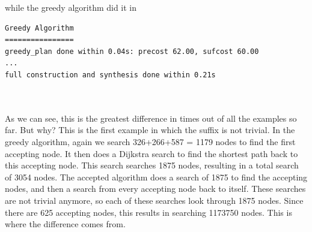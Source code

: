 while the greedy algorithm did it in \\


\begin{minipage}{\textwidth}
\begingroup
\fontsize{9pt}{12pt}\selectfont
\begin{lstlisting}
Greedy Algorithm
================
greedy_plan done within 0.04s: precost 62.00, sufcost 60.00
...
full construction and synthesis done within 0.21s 
\end{lstlisting}
\endgroup
\end{minipage} \\ \\


As we can see, this is the greatest difference in times out of all the examples so far. But why? This is the first example in which the suffix is not trivial. In the greedy algorithm, again we search 326+266+587 = 1179 nodes to find the first accepting node. It then does a Dijkstra search to find the shortest path back to this accepting node. This search searches 1875 nodes, resulting in a total search of 3054 nodes. The accepted algorithm does a search of 1875 to find the accepting nodes, and then a search from every accepting node back to itself. These searches are not trivial anymore, so each of these searches look through 1875 nodes. Since there are 625 accepting nodes, this results in searching 1173750 nodes. This is where the difference comes from. 
